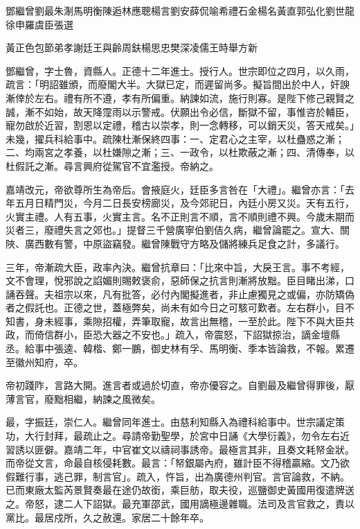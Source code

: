 
\begin{pinyinscope}
鄧繼曾劉最朱淛馬明衡陳逅林應聰楊言劉安薛侃喻希禮石金楊名黃直郭弘化劉世龍徐申羅虞臣張選{{黃正色包節弟孝謝廷王與齡周鈇楊思忠樊深凌儒王時舉方新

鄧繼曾，字士魯，資縣人。正德十二年進士。授行人。世宗即位之四月，以久雨，疏言：「明詔雖頒，而廢閣大半。大獄已定，而遲留尚多。擬旨間出於中人，奸諛漸倖於左右。禮有所不遵，孝有所偏重。納諫如流，施行則寡。是陛下修己親賢之誠，漸不如始，故天降霪雨以示警戒。伏願出令必信，斷獄不留，事惟咨於輔臣，寵勿啟於近習，割恩以定禮，稽古以崇孝，則一念轉移，可以銷天災，答天戒矣。」未幾，擢兵科給事中。疏陳杜漸保終四事：一、定君心之主宰，以杜蠱惑之漸；二、均兩宮之孝養，以杜嫌隙之漸；三、一政令，以杜欺蔽之漸；四、清傳奉，以杜假託之漸。尋言興府從駕官不宜濫授。帝納之。

嘉靖改元，帝欲尊所生為帝后。會掖庭火，廷臣多言咎在「大禮」。繼曾亦言：「去年五月日精門災，今月二日長安榜廊災，及今郊祀日，內廷小房又災。天有五行，火實主禮。人有五事，火實主言。名不正則言不順，言不順則禮不興。今歲未期而災者三，廢禮失言之郊也。」提督三千營廣寧伯劉佶久病，繼曾論罷之。宣大、關陜、廣西數有警，中原盜竊發。繼曾陳戰守方略及儲將練兵足食之計，多議行。

三年，帝漸疏大臣，政率內決。繼曾抗章曰：「比來中旨，大戾王言。事不考經，文不會理，悅邪說之諂媚則賜敕褒俞，惡師保之抗言則漸將放黜。臣目睹出涕，口誦吞聲。夫祖宗以來，凡有批答，必付內閣擬進者，非止慮獨見之或偏，亦防矯偽者之假託也。正德之世，蓋極弊矣，尚未有如今日之可駭可歎者。左右群小，目不知書，身未經事，乘隙招權，弄筆取寵，故言出無稽，一至於此。陛下不與大臣共政，而倚信群小，臣恐大器之不安也。」疏入，帝震怒，下詔獄掠治，謫金壇縣丞。給事中張逵、韓楷、鄭一鵬，御史林有孚、馬明衡、季本皆論救，不報。累遷至徽州知府，卒。

帝初踐阼，言路大開。進言者或過於切直，帝亦優容之。自劉最及繼曾得罪後，厭薄言官，廢黜相繼，納諫之風微矣。

最，字振廷，崇仁人。繼曾同年進士。由慈利知縣入為禮科給事中。世宗議定策功，大行封拜，最疏止之。尋請帝勤聖學，於宮中日誦《大學衍義》，勿令左右近習誘以匪僻。嘉靖二年，中官崔文以禱祠事誘帝。最極言其非，且奏文耗帑金狀。而帝從文言，命最自核侵耗數。最言：「帑銀屬內府，雖計臣不得稽贏縮。文乃欲假難行事，逃己罪，制言官」。疏入，忤旨，出為廣德州判官。言官論救，不納。已而東廠太監芮景賢奏最在途仍故銜，乘巨舫，取夫役，巡鹽御史黃國用復遣牌送之。帝怒，逮二人下詔獄。最充軍邵武，國用謫極邊雜職。法司及言官救之，責以黨比。最居戍所，久之赦還。家居二十餘年卒。

}}
\end{pinyinscope}
